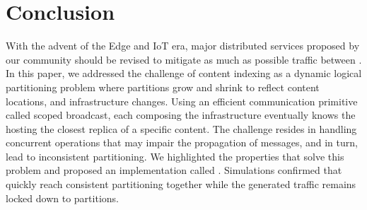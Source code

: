 \section{Conclusion}
\label{sec:conclusion}

With the advent of the Edge and IoT era, major distributed services
proposed by our community should be revised to mitigate as much as
possible traffic between \processes.  In this paper, we addressed the
challenge of content indexing as a dynamic logical partitioning
problem where partitions grow and shrink to reflect content locations,
and infrastructure changes.  Using an efficient communication
primitive called scoped broadcast, each \process composing the
infrastructure eventually knows the \process hosting the closest replica
of a specific content.  The challenge resides in handling concurrent
operations that may impair the propagation of messages, and in turn,
lead to inconsistent partitioning.
%
We highlighted the properties that solve this problem and proposed an
implementation called \NAME.  Simulations confirmed that
\processes quickly reach consistent partitioning together while the
generated traffic remains locked down to partitions.  %





